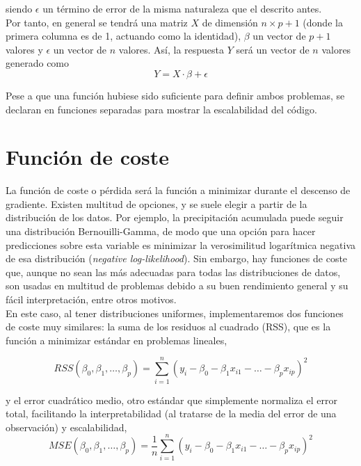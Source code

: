 \documentclass[11pt]{opticajnl}
\begin{document}
\noindent siendo $\epsilon$ un término de error de la misma naturaleza que el descrito antes. \\

Por tanto, en general se tendrá una matriz $X$ de dimensión $n\times p+1$ (donde la primera columna es de 1, actuando como la identidad), $\beta$ un vector de $p+1$ valores y $\epsilon$ un vector de $n$ valores. Así, la respuesta $Y$ será un vector de $n$ valores generado como
\begin{equation}
Y = X \cdot \beta + \epsilon
\end{equation}

Pese a que una función hubiese sido suficiente para definir ambos problemas, se declaran en funciones separadas para mostrar la escalabilidad del código.

\section{Función de coste}

La función de coste o pérdida será la función a minimizar durante el descenso de gradiente. Existen multitud de opciones, y se suele elegir a partir de la distribución de los datos. Por ejemplo, la precipitación acumulada puede seguir una distribución Bernouilli-Gamma, de modo que una opción para hacer predicciones sobre esta variable es minimizar la verosimilitud logarítmica negativa de esa distribución (\textit{negative log-likelihood}). Sin embargo, hay funciones de coste que, aunque no sean las más adecuadas para todas las distribuciones de datos, son usadas en multitud de problemas debido a su buen rendimiento general y su fácil interpretación, entre otros motivos. \\

En este caso, al tener distribuciones uniformes, implementaremos dos funciones de coste muy similares: la suma de los residuos al cuadrado (RSS), que es la función a minimizar estándar en problemas lineales,

\begin{equation}
RSS(\beta_0, \beta_1, \dots, \beta_p) = \sum_{i=1}^n (y_i - \beta_0 - \beta_1 x_{i1} - \dots - \beta_p x_{ip})^2
\end{equation}

\noindent y el error cuadrático medio, otro estándar que simplemente normaliza el error total, facilitando la interpretabilidad (al tratarse de la media del error de una observación) y escalabilidad,
\begin{equation}
MSE(\beta_0, \beta_1, \dots, \beta_p) = \frac{1}{n}\sum_{i=1}^n (y_i - \beta_0 - \beta_1 x_{i1} - \dots - \beta_p x_{ip})^2
\end{equation}
\end{document}
